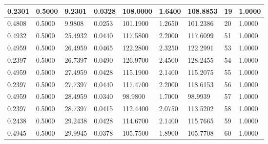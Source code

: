 \documentclass[11pt]{article}
\makeatletter
\newcommand{\boxspacing}{\kern\kvtcb@left@rule\kern\kvtcb@boxsep}
\newcommand{\prompt}[4]{
        {\ttfamily\llap{{\color{#2}[#3]:\hspace{3pt}#4}}\vspace{-\baselineskip}}
    }
\makeatother
\begin{document}
\begin{tabularx}{\textwidth}{|*9{p{}|}}
\hline
0.2301 & 0.5000 & 9.2301 & 0.0328 & 108.0000 & 1.6400 & 108.8853 & 19 & 1.0000 \\
\hline
0.4808 & 0.5000 & 9.9808 & 0.0253 & 101.1900 & 1.2650 & 101.2386 & 20 & 1.0000 \\
\hline
0.4932 & 0.5000 & 25.4932 & 0.0440 & 117.5800 & 2.2000 & 117.6099 & 51 & 1.0000 \\
\hline
0.4959 & 0.5000 & 26.4959 & 0.0465 & 122.2800 & 2.3250 & 122.2991 & 53 & 1.0000 \\
\hline
0.2397 & 0.5000 & 26.7397 & 0.0490 & 126.9700 & 2.4500 & 128.2455 & 54 & 1.0000 \\
\hline
0.4959 & 0.5000 & 27.4959 & 0.0428 & 115.1900 & 2.1400 & 115.2075 & 55 & 1.0000 \\
\hline
0.2397 & 0.5000 & 27.7397 & 0.0440 & 117.4700 & 2.2000 & 118.6153 & 56 & 1.0000 \\
\hline
0.4959 & 0.5000 & 28.4959 & 0.0340 & 98.9800 & 1.7000 & 98.9939 & 57 & 1.0000 \\
\hline
0.2397 & 0.5000 & 28.7397 & 0.0415 & 112.4400 & 2.0750 & 113.5202 & 58 & 1.0000 \\
\hline
0.2438 & 0.5000 & 29.2438 & 0.0428 & 114.6700 & 2.1400 & 115.7665 & 59 & 1.0000 \\
\hline
0.4945 & 0.5000 & 29.9945 & 0.0378 & 105.7500 & 1.8900 & 105.7708 & 60 & 1.0000 \\
\hline
\end{tabularx}

    

    \begin{tcolorbox}[breakable, size=fbox, boxrule=1pt, pad at break*=1mm,colback=cellbackground, colframe=cellborder]
\prompt{In}{incolor}{ }{\boxspacing}
\begin{Verbatim}[commandchars=\\\{\}]

\end{Verbatim}
\end{tcolorbox}
\end{document}

